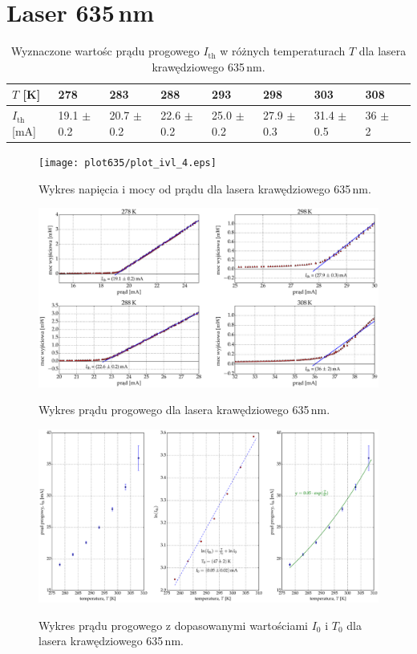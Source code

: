 \section{Laser 635\,nm}
\begin{table}
\begin{center}
\caption{ Wyznaczone wartośc prądu progowego $I_{\mathrm{th}}$ w różnych temperaturach $T$ dla lasera krawędziowego 635\,nm. }
\begin{tabular}{ | C{1.5cm}|  C{1.5cm} | C{1.5cm} | C{1.5cm}| C{1.5cm} | C{1.5cm}| C{1.5cm}| C{2.0cm}| C{2.0cm}|}
\hline
$T$ [K] 	&   278 & 283  	& 288 & 293 & 298 & 303 & 308 \\ \hline
$I_{\mathrm{th}}$ [mA]  &	19.1 $\pm$ 0.2  & 20.7 $\pm$ 0.2 & 22.6 $\pm$ 0.2 &
25.0 $\pm$ 0.2  & 27.9 $\pm$ 0.3 & 31.4 $\pm$ 0.5 & 36 $\pm$ 2	\\ \hline
\end{tabular}
\end{center}
\end{table}
\begin{figure}
\center
  \texttt{[image: plot635/plot\_ivl\_4.eps]}
  \label{rys1}
  \caption{Wykres napięcia i mocy od prądu dla lasera krawędziowego 635\,nm.}
\end{figure}
\begin{figure}
\center
  \includegraphics[scale=0.30]{plot635/plot_i_th_4.eps}
  \label{rys2}
  \caption{Wykres prądu progowego dla lasera krawędziowego 635\,nm.}
\end{figure}
\begin{figure}
\center
  \includegraphics[scale=0.30]{plot635/plot_fit.eps}
  \label{rys2}
  \caption{Wykres prądu progowego z dopasowanymi wartościami $I_{0}$ i $T_{0}$ dla lasera krawędziowego 635\,nm.}
\end{figure}
